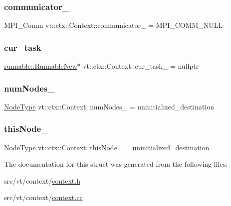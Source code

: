 \subsubsection{\texorpdfstring{communicator\+\_\+}{communicator\_}}
{\footnotesize\ttfamily M\+P\+I\+\_\+\+Comm vt\+::ctx\+::\+Context\+::communicator\+\_\+ = M\+P\+I\+\_\+\+C\+O\+M\+M\+\_\+\+N\+U\+LL\hspace{0.3cm}{\ttfamily [private]}}

\mbox{\label{structvt_1_1ctx_1_1_context_a3608ed3fc79eac87b49d38f49bdc7486}} 
\subsubsection{\texorpdfstring{cur\+\_\+task\+\_\+}{cur\_task\_}}
{\footnotesize\ttfamily \hyperlink{structvt_1_1runnable_1_1_runnable_new}{runnable\+::\+Runnable\+New}$\ast$ vt\+::ctx\+::\+Context\+::cur\+\_\+task\+\_\+ = nullptr\hspace{0.3cm}{\ttfamily [private]}}

\mbox{\label{structvt_1_1ctx_1_1_context_a58cc20215314e915f43b829ad0470299}} 
\subsubsection{\texorpdfstring{num\+Nodes\+\_\+}{numNodes\_}}
{\footnotesize\ttfamily \hyperlink{namespacevt_a866da9d0efc19c0a1ce79e9e492f47e2}{Node\+Type} vt\+::ctx\+::\+Context\+::num\+Nodes\+\_\+ = uninitialized\+\_\+destination\hspace{0.3cm}{\ttfamily [private]}}

\mbox{\label{structvt_1_1ctx_1_1_context_a5fcea79d2fede6e9945433621894624c}} 
\subsubsection{\texorpdfstring{this\+Node\+\_\+}{thisNode\_}}
{\footnotesize\ttfamily \hyperlink{namespacevt_a866da9d0efc19c0a1ce79e9e492f47e2}{Node\+Type} vt\+::ctx\+::\+Context\+::this\+Node\+\_\+ = uninitialized\+\_\+destination\hspace{0.3cm}{\ttfamily [private]}}



The documentation for this struct was generated from the following files\+:\begin{DoxyCompactItemize}
\item 
src/vt/context/\hyperlink{context_8h}{context.\+h}\item 
src/vt/context/\hyperlink{context_8cc}{context.\+cc}\end{DoxyCompactItemize}
